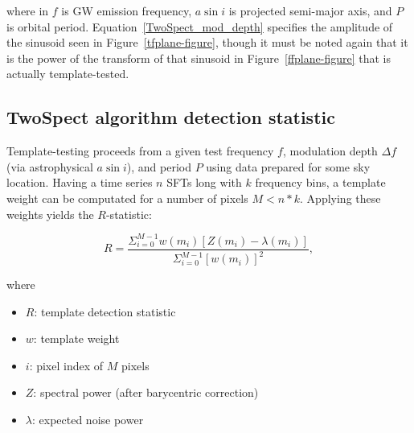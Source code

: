 \noindent where in $f$ is GW emission frequency, $a \sin i$ is projected semi-major axis, and $P$ is orbital period.
Equation~\ref{TwoSpect_mod_depth} specifies the amplitude of the sinusoid seen in Figure~\ref{tfplane-figure}, though it must be noted again that it is the power of the transform of that sinusoid in Figure~\ref{ffplane-figure} that is actually template-tested.


\subsection{TwoSpect algorithm detection statistic}


Template-testing proceeds from a given test frequency $f$, modulation depth $\Delta f$ (via astrophysical $a \sin i$), and period $P$ using data prepared for some sky location. Having a time series $n$ SFTs long with $k$ frequency bins, a template weight can be computated for a number of pixels $M < n*k$.
Applying these weights yields the $R$-statistic:

\begin{equation}
R=\frac{\Sigma_{i=0}^{M-1}w(m_{i})[Z(m_{i})-\lambda(m_{i})]}{\Sigma_{i=0}^{M-1}[w(m_{i})]^{2}},
\label{TwoSpect_R_statistic}
\end{equation}

\noindent where
\begin{itemize}
\item $R$: template detection statistic
\item $w$: template weight
\item $i$: pixel index of $M$ pixels
\item $Z$: spectral power (after barycentric correction)
\item $\lambda$: expected noise power
\end{itemize}

